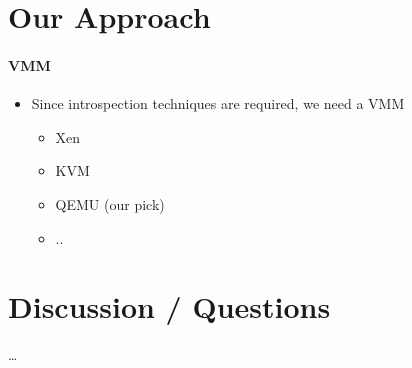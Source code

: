 \documentclass{i20lecture}
\begin{document}
\section{Our Approach}
\begin{frame}{\insertsection}
  \framesubtitle{VMM}
  
  \begin{itemize}
   \item Since introspection techniques are required, we need a VMM
\pause
    \begin{itemize}
    \item Xen
    \item KVM
    \item QEMU (our pick)
    \item ..
    \end{itemize}
  \end{itemize}
\end{frame}


\section{Discussion / Questions}
\begin{frame}{\insertsection}
  \begin{center}
    \LARGE \dots
  \end{center}
\end{frame}
\end{document}
